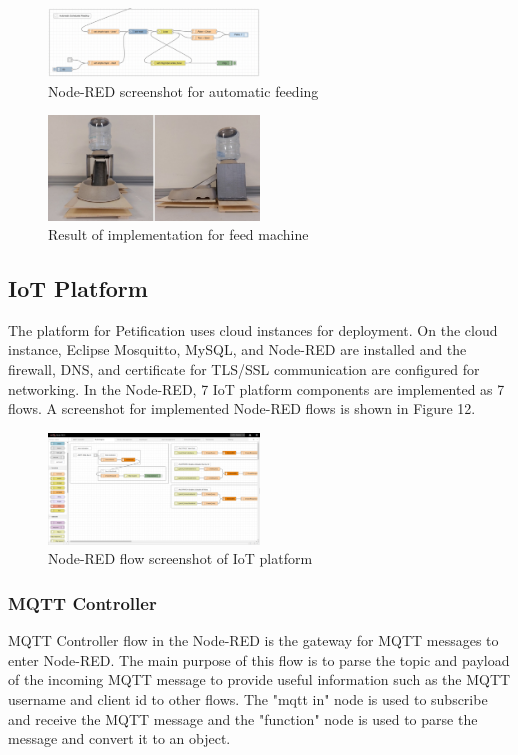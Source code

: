 ﻿\documentclass[conference]{IEEEtran}
\begin{document}
\begin{figure}[htbp]
\centerline{\includegraphics[width=0.5\textwidth]{./images/automaticFeeding.png}}
\caption{Node-RED screenshot for automatic feeding}
\label{fig}
\end{figure}

\begin{figure}[htbp]
\centerline{\includegraphics[width=0.5\textwidth]{./images/feed-machine.jpg}}
\caption{Result of implementation for feed machine}
\label{fig}
\end{figure}

\subsection{IoT Platform}
The platform for Petification uses cloud instances for deployment.
On the cloud instance, Eclipse Mosquitto, MySQL, and Node-RED are installed and the firewall, DNS, and certificate for TLS/SSL communication are configured for networking.
In the Node-RED, 7 IoT platform components are implemented as 7 flows.
A screenshot for implemented Node-RED flows is shown in Figure 12.

\begin{figure}[htbp]
\centerline{\includegraphics[width=0.5\textwidth]{./images/node-red-platform-screenshot.png}}
\caption{Node-RED flow screenshot of IoT platform}
\label{fig}
\end{figure}

\subsubsection{MQTT Controller}
MQTT Controller flow in the Node-RED is the gateway for MQTT messages to enter Node-RED.
The main purpose of this flow is to parse the topic and payload of the incoming MQTT message to provide useful information such as the MQTT username and client id to other flows.
The "mqtt in" node is used to subscribe and receive the MQTT message and the "function" node is used to parse the message and convert it to an object.
\end{document}
